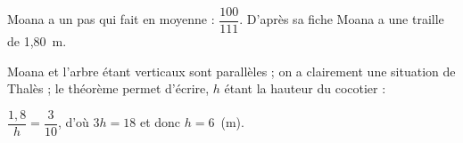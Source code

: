 
\medskip

%
% 
%
% 
% 
% 
Moana a un pas qui fait en moyenne : $\dfrac{100}{111}$. D’après sa fiche Moana a une traille de 1,80~m.

Moana et l’arbre étant verticaux sont parallèles ; on a clairement une situation de Thalès  ; le théorème permet d’écrire, $h$ étant la hauteur du cocotier :

$\dfrac{1,8}{h} = \dfrac{3}{10}$, d’où $3h = 18$ et donc $h = 6$~(m).
\bigskip


